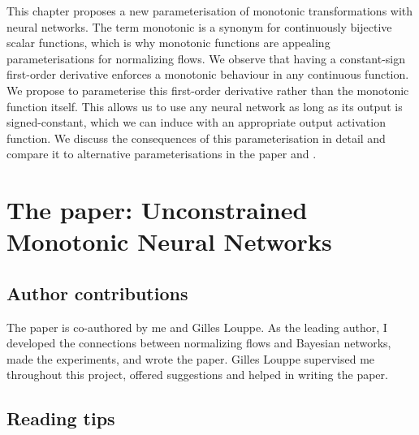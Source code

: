 This chapter proposes a new parameterisation of monotonic transformations with neural networks. The term monotonic is a synonym for continuously bijective scalar functions, which is why monotonic functions are appealing parameterisations for normalizing flows. We observe that having a constant-sign first-order derivative enforces a monotonic behaviour in any continuous function. We propose to parameterise this first-order derivative rather than the monotonic function itself. This allows us to use any neural network as long as its output is signed-constant, which we can induce with an appropriate output activation function. We discuss the consequences of this parameterisation in detail and compare it to alternative parameterisations in the paper and .

%


\section{The paper: Unconstrained Monotonic Neural Networks}
\subsection{Author contributions}
The paper is co-authored by me and Gilles Louppe. As the leading author, I developed the connections between normalizing flows and Bayesian networks, made the experiments, and wrote the paper. Gilles Louppe supervised me throughout this project, offered suggestions and helped in writing the paper.

\subsection{Reading tips}



